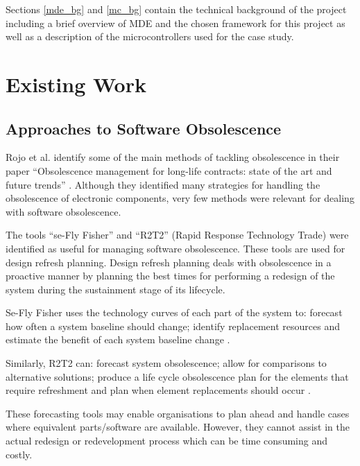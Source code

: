 \documentclass{UoYCSproject}
\begin{document}
Sections \ref{mde_bg} and \ref{mc_bg} contain the technical background of the project including a brief overview of MDE and the chosen framework for this project as well as a description of the microcontrollers used for the case study.

\section{Existing Work}
\subsection{Approaches to Software Obsolescence} \label{so_approaches}
Rojo et al. identify some of the main methods of tackling obsolescence in their paper ``Obsolescence management for long-life contracts: state of the art and future trends'' \parencite{rojo2010obsolescence}. Although they identified many strategies for handling the obsolescence of electronic components, very few methods were relevant for dealing with software obsolescence.

The tools ``se-Fly Fisher'' and ``R2T2'' (Rapid Response Technology Trade) were identified as useful for managing software obsolescence. These tools are used for design refresh planning. Design refresh planning deals with obsolescence in a proactive manner by planning the best times for performing a redesign of the system during the sustainment stage of its lifecycle. 

Se-Fly Fisher uses the technology curves of each part of the system to: forecast how often a system baseline should change; identify replacement resources and estimate the benefit of each system baseline change \parencite{rojo2010obsolescence}.

Similarly, R2T2 can: forecast system obsolescence; allow for comparisons to alternative solutions; produce a life cycle obsolescence plan for the elements that require refreshment and plan when element replacements should occur \parencite{herald2009obsolescence}.

These forecasting tools may enable organisations to plan ahead and handle cases where equivalent parts/software are available. However, they cannot assist in the actual redesign or redevelopment process which can be time consuming and costly.
\end{document}
